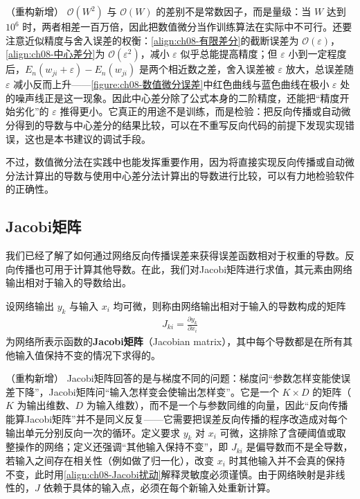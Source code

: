 \documentclass[../../main.tex]{subfiles}
\begin{document}
\begin{remark}（重构新增）
$\mathcal{O}(W^{2})$ 与 $\mathcal{O}(W)$ 的差别不是常数因子，而是量级：当 $W$ 达到 $10^{6}$ 时，两者相差一百万倍，因此把数值微分当作训练算法在实际中不可行。还要注意近似精度与舍入误差的权衡：\eqref{align:ch08-有限差分}的截断误差为 $\mathcal{O}(\varepsilon)$，\eqref{align:ch08-中心差分}为 $\mathcal{O}(\varepsilon^{2})$，减小 $\varepsilon$ 似乎总能提高精度；但 $\varepsilon$ 小到一定程度后，$E_n(w_{ji}+\varepsilon)-E_n(w_{ji})$ 是两个相近数之差，舍入误差被 $\varepsilon$ 放大，总误差随 $\varepsilon$ 减小反而上升——\cref{figure:ch08-数值微分误差}中红色曲线与蓝色曲线在极小 $\varepsilon$ 处的噪声线正是这一现象。因此中心差分除了公式本身的二阶精度，还能把“精度开始劣化”的 $\varepsilon$ 推得更小。它真正的用途不是训练，而是检验：把反向传播或自动微分得到的导数与中心差分的结果比较，可以在不重写反向代码的前提下发现实现错误，这也是本书建议的调试手段。
\end{remark}

不过，数值微分法在实践中也能发挥重要作用，因为将直接实现反向传播或自动微分法计算出的导数与使用中心差分法计算出的导数进行比较，可以有力地检验软件的正确性。

\subsection{Jacobi矩阵}\label{subsection:ch08-Jacobi矩阵}

我们已经了解了如何通过网络反向传播误差来获得误差函数相对于权重的导数。反向传播也可用于计算其他导数。在此，我们对Jacobi矩阵进行求值，其元素由网络输出相对于输入的导数给出。

\begin{definition}[Jacobi矩阵]\label{definition:ch08-Jacobi矩阵}
设网络输出 $y_k$ 与输入 $x_i$ 均可微，则称由网络输出相对于输入的导数构成的矩阵
\begin{align}
J_{ki}=\frac{\partial y_k}{\partial x_i}
\label{align:ch08-Jacobi}
\end{align}
为网络所表示函数的\textbf{Jacobi矩阵}（Jacobian matrix），其中每个导数都是在所有其他输入值保持不变的情况下求得的。
\end{definition}

\begin{remark}（重构新增）
Jacobi矩阵回答的是与梯度不同的问题：梯度问“参数怎样变能使误差下降”，Jacobi矩阵问“输入怎样变会使输出怎样变”。它是一个 $K\times D$ 的矩阵（$K$ 为输出维数、$D$ 为输入维数），而不是一个与参数同维的向量，因此“反向传播能算Jacobi矩阵”并不是同义反复——它需要把误差反向传播的程序改造成对每个输出单元分别反向一次的循环。定义要求 $y_k$ 对 $x_i$ 可微，这排除了含硬阈值或取整操作的网络；定义还强调“其他输入保持不变”，即 $J_{ki}$ 是偏导数而不是全导数，若输入之间存在相关性（例如做了归一化），改变 $x_i$ 时其他输入并不会真的保持不变，此时用\eqref{align:ch08-Jacobi扰动}解释灵敏度必须谨慎。由于网络映射是非线性的，$J$ 依赖于具体的输入点，必须在每个新输入处重新计算。
\end{remark}
\end{document}
